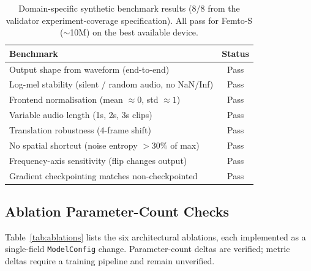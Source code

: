 \documentclass{article}
\newcommand{\passmark}{\textnormal{Pass}}
\begin{document}
\begin{table}[h]
  \centering
  \caption{Domain-specific synthetic benchmark results (8/8 from the validator
  experiment-coverage specification). All pass for Femto-S ($\sim$10M) on the
  best available device.}
  \label{tab:synth}
  \small
  \begin{tabular}{lc}
  \toprule
  \textbf{Benchmark} & \textbf{Status} \\
  \midrule
  Output shape from waveform (end-to-end) & \passmark \\
  Log-mel stability (silent / random audio, no NaN/Inf) & \passmark \\
  Frontend normalisation (mean $\approx 0$, std $\approx 1$) & \passmark \\
  Variable audio length (1s, 2s, 3s clips) & \passmark \\
  Translation robustness (4-frame shift) & \passmark \\
  No spatial shortcut (noise entropy $> 30\%$ of max) & \passmark \\
  Frequency-axis sensitivity (flip changes output) & \passmark \\
  Gradient checkpointing matches non-checkpointed & \passmark \\
  \bottomrule
  \end{tabular}
\end{table}



\subsection{Ablation Parameter-Count Checks}

Table~\ref{tab:ablations} lists the six architectural ablations, each
implemented as a single-field \texttt{ModelConfig} change. Parameter-count
deltas are verified; metric deltas require a training pipeline and remain
unverified.
\end{document}
